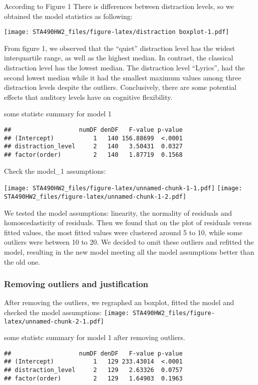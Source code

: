 \documentclass[]{article}
\begin{document}
According to Figure 1 There is differences between distraction levels,
so we obtained the model statistics as following:

\texttt{[image: STA490HW2\_files/figure-latex/distraction boxplot-1.pdf]}

From figure 1, we observed that the ``quiet'' distraction level has the
widest interquartile range, as well as the highest median. In contrast,
the classical distraction level has the lowest median. The distraction
level ``Lyrics'', had the second lowest median while it had the smallest
maximum values among three distraction levels despite the outliers.
Conclusively, there are some potential effects that auditory levels have
on cognitive flexibility.

some statistc summary for model 1

\begin{verbatim}
##                   numDF denDF   F-value p-value
## (Intercept)           1   140 156.88699  <.0001
## distraction_level     2   140   3.50431  0.0327
## factor(order)         2   140   1.87719  0.1568
\end{verbatim}

Check the model\_1 assumptions:

\texttt{[image: STA490HW2\_files/figure-latex/unnamed-chunk-1-1.pdf]}
\texttt{[image: STA490HW2\_files/figure-latex/unnamed-chunk-1-2.pdf]}

We tested the model assumptions: linearity, the normality of residuals
and homoscedasticity of residuals. Then we found that on the plot of
residuals versus fitted values, the most fitted values were clustered
around 5 to 10, while some outliers were between 10 to 20. We decided to
omit these outliers and refitted the model, resulting in the new model
meeting all the model assumptions better than the old one.

\hypertarget{removing-outliers-and-justification}{%
\subsubsection{Removing outliers and
justification}\label{removing-outliers-and-justification}}

After removing the outliers, we regraphed an boxplot, fitted the model
and checked the model assumptions:
\texttt{[image: STA490HW2\_files/figure-latex/unnamed-chunk-2-1.pdf]}

some statistc summary for model 1 after removing outliers.

\begin{verbatim}
##                   numDF denDF   F-value p-value
## (Intercept)           1   129 233.43014  <.0001
## distraction_level     2   129   2.63326  0.0757
## factor(order)         2   129   1.64903  0.1963
\end{verbatim}
\end{document}
